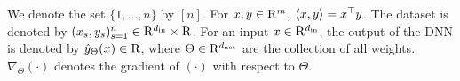We denote the set $\{1,\ldots, n\}$ by $[n]$. For $x,y\in\mathrm{R}^m$, $\langle x,y\rangle=x^\top y$. The dataset is denoted by $(x_s,y_s)_{s=1}^n\in\mathrm{R}^{d_{\text{in}}}\times \mathrm{R}$. For an input $x\in\mathrm{R}^{d_{\text{in}}}$, the output of the DNN  is denoted by $\hat{y}_{\Theta}(x)\in\mathrm{R}$, where $\Theta\in\mathrm{R}^{d_{\text{net}}}$ are the collection of all weights. $\nabla_{\Theta}(\cdot)$ denotes the gradient of $(\cdot)$ with respect to $\Theta$. 